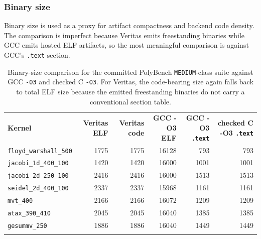\subsubsection{Binary size}

Binary size is used as a proxy for artifact compactness and backend code density. The comparison is imperfect because Veritas emits freestanding binaries while GCC emits hosted ELF artifacts, so the most meaningful comparison is against GCC's \texttt{.text} section.

\begin{table}[H]
  \centering
  \scriptsize
  \begin{tabular}{l r r r r r}
    \tablehline
    \textbf{Kernel}               & \textbf{Veritas ELF} & \textbf{Veritas code} & \textbf{GCC -O3 ELF} & \textbf{GCC -O3 \texttt{.text}} & \textbf{checked C -O3 \texttt{.text}} \\
    \tablehline
    \texttt{floyd\_warshall\_500} & 1775                 & 1775                  & 16128                & 793                             & 793                                   \\
    \texttt{jacobi\_1d\_400\_100} & 1420                 & 1420                  & 16000                & 1001                            & 1001                                  \\
    \texttt{jacobi\_2d\_250\_100} & 2416                 & 2416                  & 16000                & 1513                            & 1513                                  \\
    \texttt{seidel\_2d\_400\_100} & 2337                 & 2337                  & 15968                & 1161                            & 1161                                  \\
    \texttt{mvt\_400}             & 2166                 & 2166                  & 16072                & 1209                            & 1209                                  \\
    \texttt{atax\_390\_410}       & 2045                 & 2045                  & 16040                & 1385                            & 1385                                  \\
    \texttt{gesummv\_250}         & 1886                 & 1886                  & 16040                & 1449                            & 1449                                  \\
    \tablehline
  \end{tabular}
  \caption{Binary-size comparison for the committed PolyBench \texttt{MEDIUM}-class suite against GCC \texttt{-O3} and checked C \texttt{-O3}. For Veritas, the code-bearing size again falls back to total ELF size because the emitted freestanding binaries do not carry a conventional section table.}
  \label{tab:polybench-binary-size-summary}
\end{table}

